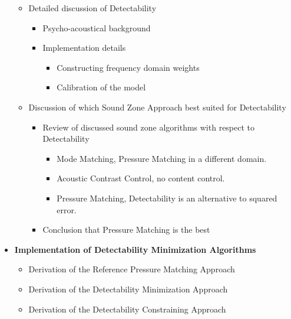 \begin{itemize}
\begin{itemize}
            \item Detailed discussion of Detectability
                \begin{itemize}
                    \item Psycho-acoustical background
                    \item Implementation details
                        \begin{itemize}
                            \item Constructing frequency domain weights
                            \item Calibration of the model
                        \end{itemize}
                \end{itemize}
            \item Discussion of which Sound Zone Approach best suited for Detectability 
                \begin{itemize}
                    \item Review of discussed sound zone algorithms with respect to Detectability
                        \begin{itemize}
                            \item Mode Matching, Pressure Matching in a different domain.
                            \item Acoustic Contrast Control, no content control.
                            \item Pressure Matching, Detectability is an alternative to squared error.
                        \end{itemize}
                    \item Conclusion that Pressure Matching is the best
                \end{itemize}
        \end{itemize}
    \item \textbf{Implementation of Detectability Minimization Algorithms}
        \begin{itemize}
            \item Derivation of the Reference Pressure Matching Approach
            \item Derivation of the Detectability Minimization Approach
            \item Derivation of the Detectability Constraining Approach
        \end{itemize}
\end{itemize}
